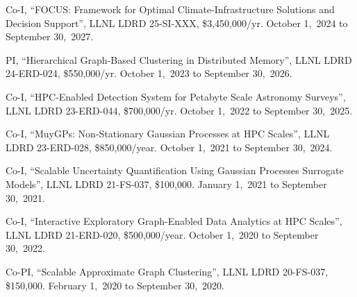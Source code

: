 \begin{innerlist}

  \item Co-I,
  ``FOCUS: Framework for Optimal Climate-Infrastructure Solutions and Decision Support'',
  LLNL LDRD 25-SI-XXX,
  \$3,450,000/yr.
  October 1,~2024 to September 30,~2027.

  \item PI,
  ``Hierarchical Graph-Based Clustering in Distributed Memory'',
  LLNL LDRD 24-ERD-024,
  \$550,000/yr.
  October 1,~2023 to September 30,~2026.

  \item Co-I,
  ``HPC-Enabled Detection System for Petabyte Scale Astronomy Surveys'',
  LLNL LDRD 23-ERD-044,
  \$700,000/yr.
  October 1,~2022 to September 30,~2025.

  \item Co-I,
  ``MuyGPs: Non-Stationary Gaussian Processes at HPC Scales'',
  LLNL LDRD 23-ERD-028,
  \$850,000/year.
  October 1,~2021 to September 30,~2024.

  \item Co-I,
  ``Scalable Uncertainty Quantification Using Gaussian Processes Surrogate Models'',
  LLNL LDRD 21-FS-037,
  \$100,000.
  January 1,~2021 to September 30,~2021.

  \item Co-I,
  ``Interactive Exploratory Graph-Enabled Data Analytics at HPC Scales'',
  LLNL LDRD 21-ERD-020,
  \$500,000/year.
  October 1,~2020 to September 30,~2022.

  \item Co-PI,
  ``Scalable Approximate Graph Clustering'',
  LLNL LDRD 20-FS-037,
  \$150,000.
  February 1,~2020 to September 30,~2020.

\end{innerlist}
